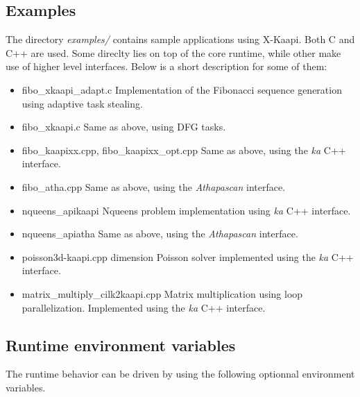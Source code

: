 \documentclass{article}
\newcommand{\kaapi}{\textsc{X}-Kaapi\xspace}
\begin{document}
\subsection{Examples}
The directory \textit{examples/} contains sample applications using \kaapi.
Both C and C++ are used. Some direclty lies on top of the core runtime,
while other make use of higher level interfaces. Below is a short
description for some of them:
\begin{itemize}
\item fibo\_xkaapi\_adapt.c\newline
Implementation of the Fibonacci sequence generation using adaptive
task stealing.
\item fibo\_xkaapi.c\newline
Same as above, using DFG tasks.
\item fibo\_kaapixx.cpp, fibo\_kaapixx\_opt.cpp\newline
Same as above, using the \textit{ka} C++ interface.
\item fibo\_atha.cpp\newline
Same as above, using the \textit{Athapascan} interface.
\item nqueens\_apikaapi\newline
Nqueens problem implementation using \textit{ka} C++ interface.
\item nqueens\_apiatha\newline
Same as above, using the \textit{Athapascan} interface.
\item poisson3d-kaapi.cpp dimension Poisson solver implemented using the \textit{ka}
C++ interface.
\item matrix\_multiply\_cilk2kaapi.cpp\newline
Matrix multiplication using loop parallelization. Implemented using
the \textit{ka} C++ interface.
\end{itemize}

\subsection{Runtime environment variables}
The runtime behavior can be driven by using the following
optionnal environment variables.
\end{document}
